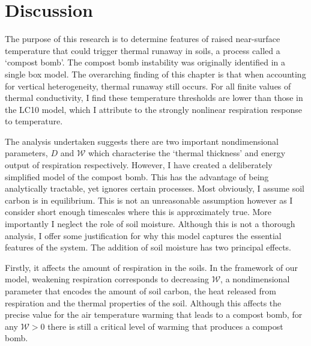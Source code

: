 \section{Discussion}

The purpose of this research is to determine features of raised near-surface temperature that could trigger thermal runaway in soils, a process called a `compost bomb'.
The compost bomb instability was originally identified in a single box model. The overarching finding of this chapter is that when accounting for vertical heterogeneity,
thermal runaway still occurs. For all finite values of thermal conductivity, I find these temperature thresholds are lower than those in the LC10 model, which I attribute
to the strongly nonlinear respiration response to temperature.

The analysis undertaken suggests there are two important nondimensional parameters, $D$ and $\mathcal{W}$ which characterise the `thermal thickness' and energy output
of respiration respectively.
However, I have created a deliberately simplified model of the compost bomb. This has the advantage of being analytically tractable, yet ignores certain processes. Most obviously,
I assume soil carbon is in equilibrium. This is not an unreasonable assumption however as I consider short enough timescales where this is approximately true.
More importantly I neglect the role of soil moisture. Although this is not a thorough analysis, I offer some justification for why this model captures
the essential features of the system. The addition of soil moisture has two principal effects.

Firstly, it affects the amount of respiration in the soils. In the framework of our model, weakening respiration corresponds to decreasing $\mathcal{W}$,
a nondimensional parameter that encodes the amount of soil carbon, the heat released from respiration and the thermal properties of the soil. 
Although this affects the precise value for the air temperature warming that leads to a compost bomb, for any $\mathcal{W} > 0$ there is still a critical level of warming that produces a compost bomb.

